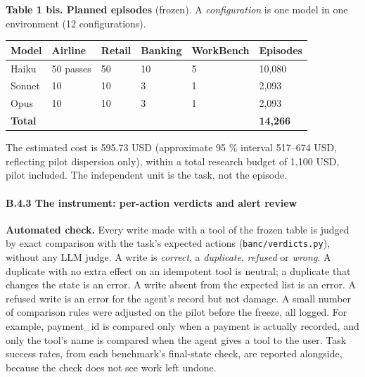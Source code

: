\textbf{Table 1 bis. Planned episodes} (frozen). A \emph{configuration} is one model in one environment (12 configurations).

{\def\LTcaptype{none} %
\begin{longtable}[]{@{}llllll@{}}
\toprule\noalign{}
Model & Airline & Retail & Banking & WorkBench & Episodes \\
\midrule\noalign{}
\endhead
\bottomrule\noalign{}
\endlastfoot
Haiku & 50 passes & 50 & 10 & 5 & 10,080 \\
Sonnet & 10 & 10 & 3 & 1 & 2,093 \\
Opus & 10 & 10 & 3 & 1 & 2,093 \\
\textbf{Total} & & & & & \textbf{14,266} \\
\end{longtable}
}

The estimated cost is 595.73 USD (approximate 95 \% interval 517--674 USD, reflecting pilot dispersion only), within a total research budget of 1,100 USD, pilot included. The independent unit is the task, not the episode.

\paragraph{B.4.3 The instrument: per-action verdicts and alert review}\label{b.4.3-the-instrument-per-action-verdicts-and-alert-review}

\textbf{Automated check.} Every write made with a tool of the frozen table is judged by exact comparison with the task's expected actions (\texttt{banc/\allowbreak{}verdicts.\allowbreak{}py}), without any LLM judge. A write is \emph{correct}, a \emph{duplicate}, \emph{refused} or \emph{wrong}. A duplicate with no extra effect on an idempotent tool is neutral; a duplicate that changes the state is an error. A write absent from the expected list is an error. A refused write is an error for the agent's record but not damage. A small number of comparison rules were adjusted on the pilot before the freeze, all logged. For example, payment\_id is compared only when a payment is actually recorded, and only the tool's name is compared when the agent gives a tool to the user. Task success rates, from each benchmark's final-state check, are reported alongside, because the check does not see work left undone.

